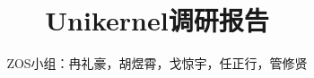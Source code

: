 \documentclass{book}
\begin{document}
\begin{titlepage}
    \title{
        Unikernel调研报告
    }
    \author{ZOS小组：冉礼豪，胡煜霄，戈惊宇，任正行，管修贤}
\end{titlepage}
\maketitle
\tableofcontents






\end{document}
